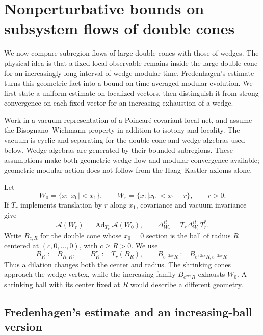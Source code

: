 \documentclass[a4paper,11pt]{article}
\theoremstyle{definition}
\begin{document}
\section{Nonperturbative bounds on subsystem flows of double cones}\label{section:approx}

We now compare subregion flows of large double cones with those of wedges. The physical idea is that a fixed local observable remains inside the large double cone for an increasingly long interval of wedge modular time. Fredenhagen's estimate \cite{fredenhagen} turns this geometric fact into a bound on time-averaged modular evolution. We first state a uniform estimate on localized vectors, then distinguish it from strong convergence on each fixed vector for an increasing exhaustion of a wedge.

Work in a vacuum representation of a Poincar\'e-covariant local net, and assume the Bisognano--Wichmann property in addition to isotony and locality. The vacuum is cyclic and separating for the double-cone and wedge algebras used below. Wedge algebras are generated by their bounded subregions. These assumptions make both geometric wedge flow and modular convergence available; geometric modular action does not follow from the Haag--Kastler axioms alone.

Let
\begin{equation}
 W_0=\{x:|x_0|<x_1\},\qquad
 W_r=\{x:|x_0|<x_1-r\},\qquad r>0.
\end{equation}
If $T_r$ implements translation by $r$ along $x_1$, covariance and vacuum invariance give
\begin{equation}
 \mathcal A(W_r)=\operatorname{Ad}_{T_r}\mathcal A(W_0),
 \qquad \Delta_{W_r}^{it}=T_r\Delta_{W_0}^{it}T_r^*.
\end{equation}
Write $B_{c,R}$ for the double cone whose $x_0=0$ section is the ball of radius $R$ centered at $(c,0,\ldots,0)$, with $c\geq R>0$. We use
\begin{equation}
 B_R:=B_{R,R},\qquad B_R^r:=T_r(B_R),\qquad
 B_{e^{\pm2\pi s}R}:=B_{e^{\pm2\pi s}R,e^{\pm2\pi s}R}.
 \label{eq:approx-ball-notation}
\end{equation}
Thus a dilation changes both the center and radius. The shrinking cones approach the wedge vertex, while the increasing family $B_{e^{2\pi s}R}$ exhausts $W_0$. A shrinking ball with its center fixed at $R$ would describe a different geometry.

\subsection{Fredenhagen's estimate and an increasing-ball version}
\end{document}
